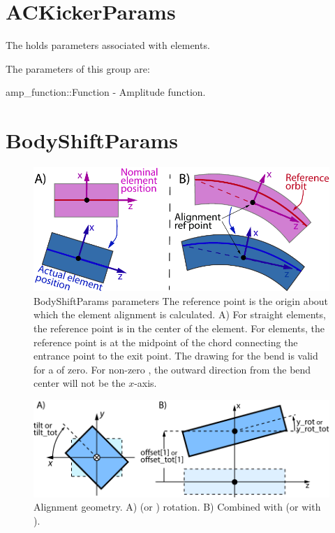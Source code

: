 \section{ACKickerParams}
\label{s:ackicker.g}

The  holds parameters associated with  elements.

The parameters of this group are:
\begin{example}
  amp_function::Function      - Amplitude function.
\end{example}

\newpage

\section{BodyShiftParams}
\label{s:alignment.g}

\begin{figure}[bt]
\centering \includegraphics{alignment-ref.pdf} 
\caption[Element alignment.]  
{BodyShiftParams parameters The reference point is the origin
about which the element alignment is calculated. 
A) For straight elements, the reference point is in the center of the element. 
For  elements, the reference point is at the midpoint of the chord connecting
the entrance point to the exit point. The drawing for the bend is valid for a 
of zero. For non-zero , the outward direction from the bend center will not be
the $x$-axis. 
}  \label{f:alignment}
\end{figure}

\begin{figure}
\centering \includegraphics{alignment2.pdf} \caption[Alignment geometry.]  
{Alignment geometry. A)  (or ) rotation. B) Combined
 with  (or  with ).
}  \label{f:alignment}
\end{figure}

